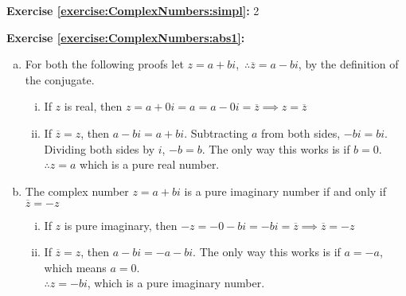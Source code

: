 \noindent\textbf{Exercise \ref{exercise:ComplexNumbers:simpl}:}
2

\noindent\textbf{Exercise \ref{exercise:ComplexNumbers:abs1}:}  %
\begin{enumerate}[(a)]
\item
For both the following proofs let $z = a + bi$,\ $\therefore \overline{z} = a - bi$, by the definition of the conjugate.
        \begin{enumerate}[i.]
            \item 
            If $z$ is real, then $z = a + 0i = a = a - 0i = \overline{z}\implies z = \overline{z}$
            \item 
            If $\overline{z} = z$, then $a - bi = a + bi$. Subtracting $a$ from both sides, $-bi = bi$. Dividing both sides by $i$, $-b = b$. The only way this works is if $b=0$.\\
            $\therefore z=a$ which is a pure real number.
        \end{enumerate}
 
\item
The complex number $z = a + bi$ is a pure imaginary number if and only if $\overline{z} = -z$
        \begin{enumerate}[i.]
            \item
            If $z$ is pure imaginary, then $-z = -0 - bi = - bi = \overline{z}\implies \overline{z} = -z$
            \item
             If $\overline{z} = z$, then $a - bi = -a - bi$. The only way this works is if $a = -a$, which means $a=0$.\\
            $\therefore z = -bi$, which is a pure imaginary number.
        \end{enumerate}
\end{enumerate}
 
